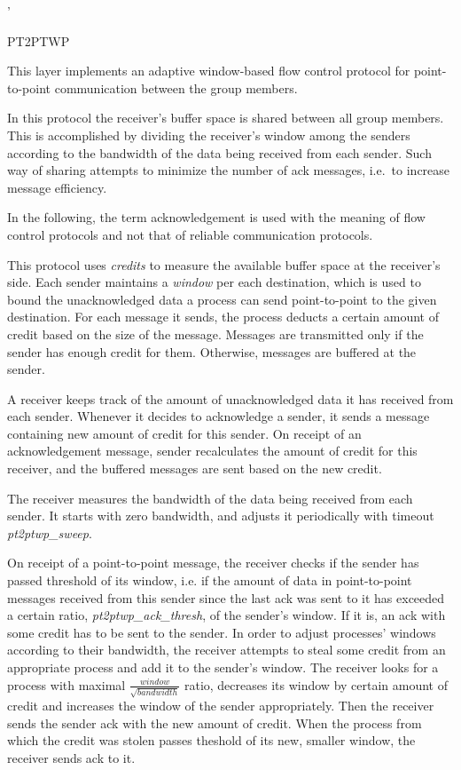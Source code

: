 '\begin{Layer}{PT2PTWP} 

This layer implements an adaptive window-based flow control protocol 
for point-to-point communication between the group members. 

In this protocol the receiver's buffer space is shared between all group
members. This is accomplished by dividing the receiver's window among 
the senders according to the bandwidth of the data being received from each 
sender. Such way of sharing attempts to minimize the number of ack messages, 
i.e.\ to increase message efficiency.

\begin{Protocol}
In the following, the term acknowledgement is used with the meaning 
of flow control protocols and not that of reliable communication protocols.

This protocol uses \emph{credits} to measure the available buffer space 
at the receiver's side. Each sender maintains a \emph{window} per each 
destination, which is used to bound the unacknowledged data a process 
can send point-to-point to the given destination. For each message it 
sends, the process deducts a certain amount of credit based on the size 
of the message. Messages are transmitted only if the sender has enough 
credit for them. Otherwise, messages are buffered at the sender.

A receiver keeps track of the amount of unacknowledged data it has 
received from each sender. Whenever it decides to acknowledge a sender,
it sends a message containing new amount of credit for this sender.
On receipt of an acknowledgement message, sender recalculates the amount 
of credit for this receiver, and the buffered messages are sent based 
on the new credit.

The receiver measures the bandwidth of the data being received from each 
sender. It starts with zero bandwidth, and adjusts it periodically with 
timeout \emph{pt2ptwp\_sweep}. 

On receipt of a point-to-point message, the receiver checks if the sender 
has passed threshold of its window, i.e. if the amount of data in
point-to-point messages received from this sender since the last ack was
sent to it has exceeded a certain ratio, \emph{pt2ptwp\_ack\_thresh}, 
of the sender's window. If it is, an ack with some credit has to be sent 
to the sender. In order to adjust processes' windows according to their 
bandwidth, the receiver attempts to steal some credit from an appropriate 
process and add it to the sender's window. The receiver looks for a process 
with maximal \( \frac{window}{\sqrt{bandwidth}} \) ratio, decreases its window 
by certain amount of credit and increases the window of the sender appropriately. 
Then the receiver sends the sender ack with the new amount of credit. When the 
process from which the credit was stolen passes theshold of its new, smaller 
window, the receiver sends ack to it.
\end{Protocol}


\end{Layer}
